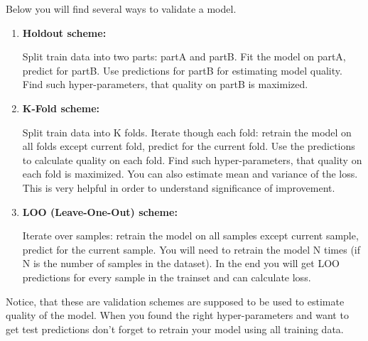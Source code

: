 \documentclass[11pt, twoside]{article}   	%
\begin{document}
Below you will find several ways to validate a model.
\begin{enumerate}
   \item  \textbf{ Holdout scheme:}

Split train data into two parts: partA and partB.
Fit the model on partA, predict for partB.
Use predictions for partB for estimating model quality. Find such hyper-parameters, that quality on partB is maximized.

   \item  \textbf{ K-Fold scheme:}

Split train data into K folds.
Iterate though each fold: retrain the model on all folds except current fold, predict for the current fold.
Use the predictions to calculate quality on each fold. Find such hyper-parameters, that quality on each fold is maximized. You can also estimate mean and variance of the loss. This is very helpful in order to understand significance of improvement.

   \item  \textbf{ LOO (Leave-One-Out) scheme:}

Iterate over samples: retrain the model on all samples except current sample, predict for the current sample. You will need to retrain the model N times (if N is the number of samples in the dataset).
In the end you will get LOO predictions for every sample in the trainset and can calculate loss.

  \end{enumerate}
Notice, that these are validation schemes are supposed to be used to estimate quality of the model. When you found the right hyper-parameters and want to get test predictions don't forget to retrain your model using all training data.


\noindent
\end{document}
